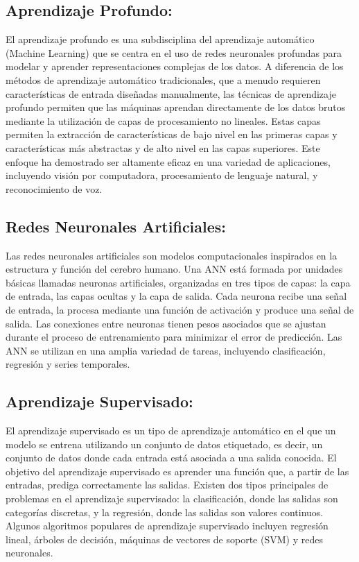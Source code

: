 \subsection{Aprendizaje Profundo: }
El aprendizaje profundo es una subdisciplina del aprendizaje automático (Machine Learning) que se centra en el uso de redes neuronales profundas para modelar y aprender representaciones complejas de los datos. A diferencia de los métodos de aprendizaje automático tradicionales, que a menudo requieren características de entrada diseñadas manualmente, las técnicas de aprendizaje profundo permiten que las máquinas aprendan directamente de los datos brutos mediante la utilización de capas de procesamiento no lineales. Estas capas permiten la extracción de características de bajo nivel en las primeras capas y características más abstractas y de alto nivel en las capas superiores. Este enfoque ha demostrado ser altamente eficaz en una variedad de aplicaciones, incluyendo visión por computadora, procesamiento de lenguaje natural, y reconocimiento de voz.
\subsection{Redes Neuronales Artificiales: }
Las redes neuronales artificiales son modelos computacionales inspirados en la estructura y función del cerebro humano. Una ANN está formada por unidades básicas llamadas neuronas artificiales, organizadas en tres tipos de capas: la capa de entrada, las capas ocultas y la capa de salida. Cada neurona recibe una señal de entrada, la procesa mediante una función de activación y produce una señal de salida. Las conexiones entre neuronas tienen pesos asociados que se ajustan durante el proceso de entrenamiento para minimizar el error de predicción. Las ANN se utilizan en una amplia variedad de tareas, incluyendo clasificación, regresión y series temporales.
\subsection{Aprendizaje Supervisado: }
El aprendizaje supervisado es un tipo de aprendizaje automático en el que un modelo se entrena utilizando un conjunto de datos etiquetado, es decir, un conjunto de datos donde cada entrada está asociada a una salida conocida. El objetivo del aprendizaje supervisado es aprender una función que, a partir de las entradas, prediga correctamente las salidas. Existen dos tipos principales de problemas en el aprendizaje supervisado: la clasificación, donde las salidas son categorías discretas, y la regresión, donde las salidas son valores continuos. Algunos algoritmos populares de aprendizaje supervisado incluyen regresión lineal, árboles de decisión, máquinas de vectores de soporte (SVM) y redes neuronales.
